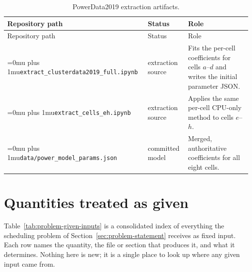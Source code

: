﻿\documentclass[12pt]{article}
\newcommand{\codepath}[1]{{\Urlmuskip=0mu plus 1mu\relax\nolinkurl{#1}}}
\begin{document}
\begin{longtable}{@{}L{0.34\textwidth}L{0.19\textwidth}L{0.39\textwidth}@{}}
  \caption{PowerData2019 extraction artifacts.}
  \label{tab:powerdata-lineage}\\
  \toprule
  Repository path & Status & Role \\
  \midrule
  \endfirsthead
  \toprule
  Repository path & Status & Role \\
  \midrule
  \endhead
  \codepath{extract_clusterdata2019_full.ipynb}
    & extraction source
    & Fits the per-cell coefficients for cells \(a\)--\(d\) and writes the
      initial parameter JSON. \\
  \codepath{extract_cells_eh.ipynb}
    & extraction source
    & Applies the same per-cell CPU-only method to cells \(e\)--\(h\). \\
  \codepath{data/power_model_params.json}
    & committed model
    & Merged, authoritative coefficients for all eight cells. \\
  \bottomrule
\end{longtable}

\section{Quantities treated as given}
\label{app:given-inputs}

Table~\ref{tab:problem-given-inputs} is a consolidated index of everything the scheduling problem of Section~\ref{sec:problem-statement} receives as fixed input. Each row names the quantity, the file or section that produces it, and what it determines. Nothing here is new; it is a single place to look up where any given input came from.
\end{document}
